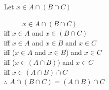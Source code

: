 \documentclass[\main/notes.tex]{subfiles}
\begin{document}
\begin{example}
\begin{questions}[before=\raggedright]
\begin{answer}
\begin{minipage}{0.6\textwidth}
									Let $x \in A \cap (B \cap C)$
									\begin{tabbing}
										$\qquad$ \= $x \in A \cap (B \cap C)$\\
										iff \> $x \in A$ and $x \in (B \cap C)$\\
										iff \> $x \in A$ and $x \in B$ and $x \in C$\\
										iff \> ($x \in A$ and $x \in B$) and $x \in C$\\
										iff \> ($x \in (A \cap B)$) and $x \in C$\\
										iff \> $x \in (A \cap B) \cap C$\\
										$\therefore$ \> $A \cap (B \cap C) = (A \cap B) \cap C$
									\end{tabbing}
								\end{minipage}
								\begin{minipage}{0.33\textwidth}
									\begin{center}
										\begin{vennthree}[][]
											\fillACapBCapC
										\end{vennthree}
									\end{center}
								\end{minipage}
							\end{answer}
				\end{questions}
			\end{example}
		\pagebreak
\end{document}
